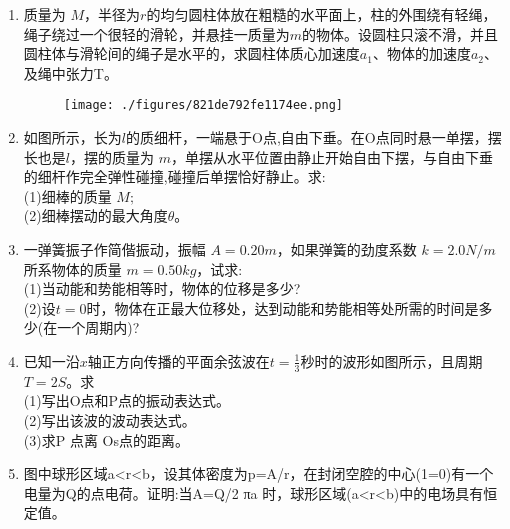
\begin{enumerate}
\item 质量为 $M$，半径为$r$的均匀圆柱体放在粗糙的水平面上，柱的外围绕有轻绳，绳子绕过一个很轻的滑轮，并悬挂一质量为$m $的物体。设圆柱只滚不滑，并且圆柱体与滑轮间的绳子是水平的，求圆柱体质心加速度$ a_1$、物体的加速度$ a_2$、及绳中张力T。
\begin{figure}[ht]
\centering
\texttt{[image: ./figures/821de792fe1174ee.png]}
\caption{} \label{fig_SD05_1}
\end{figure}
\item 如图所示，长为$l$的质细杆，一端悬于O点,自由下垂。在O点同时悬一单摆，摆长也是$l$，摆的质量为 $m$，单摆从水平位置由静止开始自由下摆，与自由下垂的细杆作完全弹性碰撞,碰撞后单摆恰好静止。求:\\
(1)细棒的质量 $M;$\\
(2)细棒摆动的最大角度$\theta$。
\item 一弹簧振子作简偕振动，振幅 $A=0.20m$，如果弹簧的劲度系数 $k=2.0N/m$所系物体的质量 $m=0.50kg$，试求:\\
(1)当动能和势能相等时，物体的位移是多少?\\
(2)设$t=0$时，物体在正最大位移处，达到动能和势能相等处所需的时间是多少(在一个周期内)?
\item 已知一沿$x$轴正方向传播的平面余弦波在$t=\frac{1}{3}$秒时的波形如图所示，且周期$T=2S$。求\\
(1)写出O点和P点的振动表达式。\\
(2)写出该波的波动表达式。\\
(3)求P 点离 Os点的距离。
\item 图中球形区域a<r<b，设其体密度为p=A/r，在封闭空腔的中心(1=0)有一个电量为Q的点电荷。证明:当A=Q/2 πa 时，球形区域(a<r<b)中的电场具有恒定值。
\end{enumerate}